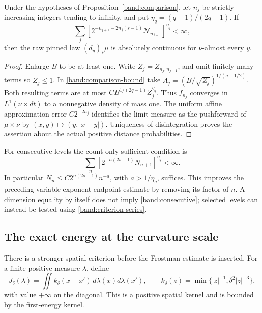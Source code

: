 \begin{theorem}
\label{band:criterion}
Under the hypotheses of Proposition~\ref{band:comparison}, let
\(n_j\) be strictly increasing integers tending to infinity, and put
\(\eta_q=(q-1)/(2q-1)\). If
\begin{equation}\label{band:criterion-series}
\sum_j\left[
2^{-n_{j+1}-2n_j(s-1)}\mathcal N_{n_{j+1}}
\right]^{\eta_q}<\infty,
\end{equation}
then the raw pinned law \((d_y)_*\mu\) is absolutely continuous for
\(\nu\)-almost every \(y\).
\end{theorem}
\begin{proof}
Enlarge \(B\) to be at least one. Write \(Z_j=Z_{n_j,n_{j+1}}\), and
omit finitely many terms so \(Z_j\leq1\). In
\eqref{band:comparison-bound} take
\(A_j=(B/\sqrt{Z_j})^{1/(q-1/2)}\). Both resulting terms are at most
\(CB^{1/(2q-1)}Z_j^{\eta_q}\). Thus \(f_{n_j}\) converges in
\(L^1(\nu\times dt)\) to a nonnegative density of mass one. The uniform
affine approximation error \(C2^{-2n_j}\) identifies the limit measure
as the pushforward of \(\mu\times\nu\) by
\((x,y)\mapsto(y,|x-y|)\). Uniqueness of disintegration proves the
assertion about the actual positive distance probabilities.
\end{proof}

For consecutive levels the count-only sufficient condition is
\begin{equation}\label{band:consecutive}
\sum_n\left[2^{-n(2s-1)}N_{n+1}\right]^{\eta_q}<\infty.
\end{equation}
In particular \(N_n\leq C2^{n(2s-1)}n^{-a}\), with
\(a>1/\eta_q\), suffices. This improves the preceding variable-exponent
endpoint estimate by removing its factor of \(n\). A dimension equality
by itself does not imply \eqref{band:consecutive}; selected levels can
instead be tested using \eqref{band:criterion-series}.

\subsection{The exact energy at the curvature scale}
\label{band:energy-section}

There is a stronger spatial criterion before the Frostman estimate is
inserted. For a finite positive measure \(\lambda\), define
\begin{equation}\label{band:truncated-energy}
J_\delta(\lambda)=\iint k_\delta(x-x')\,d\lambda(x)d\lambda(x'),
\qquad
k_\delta(z)=\min\{|z|^{-1},\delta^2|z|^{-3}\},
\end{equation}
with value \(+\infty\) on the diagonal. This is a positive spatial
kernel and is bounded by the first-energy kernel.

